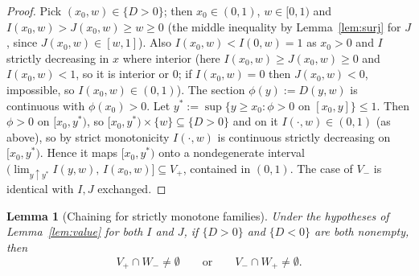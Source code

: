 \documentclass{amsart}
\theoremstyle{plain}
\newtheorem{lemma}{Lemma}
\theoremstyle{definition}
\begin{document}
\begin{proof}
Pick $(x_0,w)\in\{D>0\}$; then $x_0\in(0,1)$, $w\in[0,1)$ and
$I(x_0,w)>J(x_0,w)\ge w\ge0$ (the middle inequality by Lemma~\ref{lem:surj} for $J$, since
$J(x_0,w)\in[w,1]$). Also $I(x_0,w)<I(0,w)=1$ as $x_0>0$ and $I$ strictly decreasing in
$x$ where interior (here $I(x_0,w)\ge J(x_0,w)\ge 0$ and $I(x_0,w)<1$, so it is interior or
$0$; if $I(x_0,w)=0$ then $J(x_0,w)<0$, impossible, so $I(x_0,w)\in(0,1)$).
The section $\phi(y):=D(y,w)$ is continuous with $\phi(x_0)>0$.  Let
$y^\ast:=\sup\{y\ge x_0:\phi>0\text{ on }[x_0,y]\}\le 1$.  Then $\phi>0$ on $[x_0,y^\ast)$,
so $[x_0,y^\ast)\times\{w\}\subseteq\{D>0\}$ and on it $I(\cdot,w)\in(0,1)$ (as above), so
by strict monotonicity $I(\cdot,w)$ is continuous strictly decreasing on $[x_0,y^\ast)$.
Hence it maps $[x_0,y^\ast)$ onto a nondegenerate interval
$\bigl(\lim_{y\uparrow y^\ast}I(y,w),\,I(x_0,w)\bigr]\subseteq V_+$, contained in $(0,1)$.
The case of $V_-$ is identical with $I,J$ exchanged.
\end{proof}

\begin{lemma}[Chaining for strictly monotone families]\label{lem:chain}
Under the hypotheses of Lemma~\ref{lem:value} for both $I$ and $J$, if $\{D>0\}$ and
$\{D<0\}$ are both nonempty, then
\[
V_+\cap W_-\ne\emptyset\qquad\text{or}\qquad V_-\cap W_+\ne\emptyset.
\]
\end{lemma}
\end{document}
